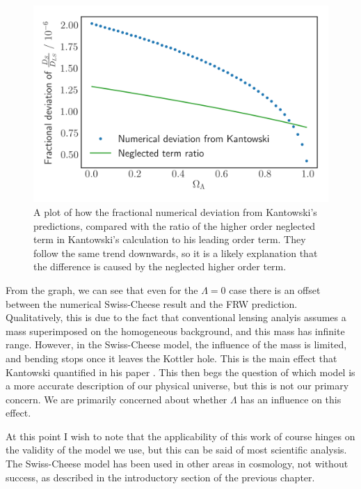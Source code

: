 \begin{figure}
  \centering
  \includegraphics[height=0.5\linewidth]{images/flat-neglected.png}
  \caption{A plot of how the fractional numerical deviation from Kantowski's predictions, compared with the ratio of the higher order neglected term in Kantowski's calculation to his leading order term. They follow the same trend downwards, so it is a likely explanation that the difference is caused by the neglected higher order term.}
  \label{fig:flat-const-m-neglected}
\end{figure}

From the graph, we can see that even for the $\Lambda = 0$ case there is an offset between the numerical Swiss-Cheese result and the FRW prediction. Qualitatively, this is due to the fact that conventional lensing analyis assumes a mass superimposed on the homogeneous background, and this mass has infinite range. However, in the Swiss-Cheese model, the influence of the mass is limited, and bending stops once it leaves the Kottler hole. This is the main effect that Kantowski quantified in his paper \citet{kantowski2010gravitational}. This then begs the question of which model is a more accurate description of our physical universe, but this is not our primary concern. We are primarily concerned about whether $\Lambda$ has an influence on this effect. 

At this point I wish to note that the applicability of this work of course hinges on the validity of the model we use, but this can be said of most scientific analysis. The Swiss-Cheese model has been used in other areas in cosmology, not without success, as described in the introductory section of the previous chapter.  

